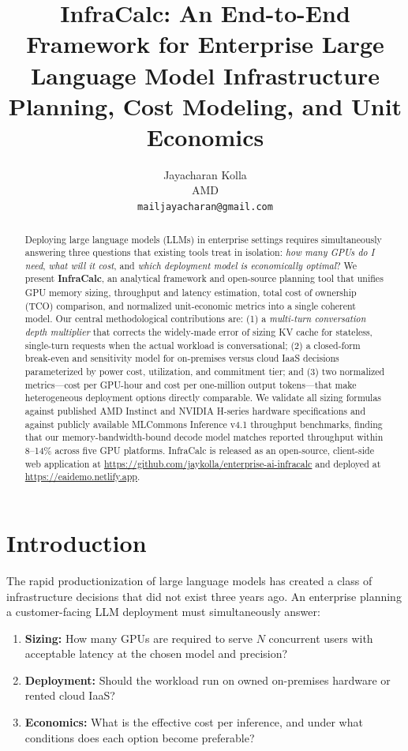 \documentclass{article}
\title{InfraCalc: An End-to-End Framework for Enterprise Large Language Model
       Infrastructure Planning, Cost Modeling, and Unit Economics}
\author{%
  Jayacharan Kolla \\
  AMD \\
  \texttt{mailjayacharan@gmail.com}
}
\begin{document}
\maketitle

\begin{abstract}
Deploying large language models (LLMs) in enterprise settings requires
simultaneously answering three questions that existing tools treat in
isolation: \emph{how many GPUs do I need}, \emph{what will it cost}, and
\emph{which deployment model is economically optimal}?
We present \textbf{InfraCalc}, an analytical framework and open-source
planning tool that unifies GPU memory sizing, throughput and latency
estimation, total cost of ownership (TCO) comparison, and normalized
unit-economic metrics into a single coherent model.
Our central methodological contributions are: (1) a \emph{multi-turn
conversation depth multiplier} that corrects the widely-made error of sizing
KV cache for stateless, single-turn requests when the actual workload is
conversational; (2) a closed-form break-even and sensitivity model for
on-premises versus cloud IaaS decisions parameterized by power cost,
utilization, and commitment tier; and (3) two normalized metrics—cost per
GPU-hour and cost per one-million output tokens—that make heterogeneous
deployment options directly comparable.
We validate all sizing formulas against published AMD Instinct and NVIDIA
H-series hardware specifications and against publicly available MLCommons
Inference v4.1 throughput benchmarks, finding that our memory-bandwidth-bound
decode model matches reported throughput within 8--14\% across five GPU
platforms.
InfraCalc is released as an open-source, client-side web application at
\url{https://github.com/jaykolla/enterprise-ai-infracalc} and deployed at
\url{https://eaidemo.netlify.app}.
\end{abstract}

\section{Introduction}
\label{sec:intro}

The rapid productionization of large language models has created a class of
infrastructure decisions that did not exist three years ago. An enterprise
planning a customer-facing LLM deployment must simultaneously answer:

\begin{enumerate}
  \item \textbf{Sizing:} How many GPUs are required to serve $N$ concurrent
        users with acceptable latency at the chosen model and precision?
  \item \textbf{Deployment:} Should the workload run on owned on-premises
        hardware or rented cloud IaaS?
  \item \textbf{Economics:} What is the effective cost per inference, and
        under what conditions does each option become preferable?
\end{enumerate}
\end{document}
